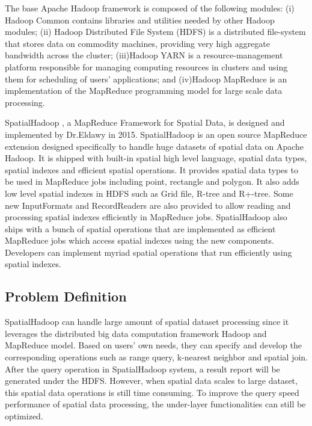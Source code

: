 The base Apache Hadoop framework is composed of the following modules: (i) Hadoop Common contains libraries and utilities needed by other Hadoop modules; (ii) Hadoop Distributed File System (HDFS) is a distributed file-system that stores data on commodity machines, providing very high aggregate bandwidth across the cluster; (iii)Hadoop YARN is a resource-management platform responsible for managing computing resources in clusters and using them for scheduling of users' applications; and (iv)Hadoop MapReduce is an implementation of the MapReduce programming model for large scale data processing.

SpatialHadoop \cite{eldawy2015spatialhadoop}, a MapReduce Framework for Spatial Data, is designed and implemented by Dr.Eldawy in 2015. SpatialHadoop is an open source MapReduce extension designed specifically to handle huge datasets of spatial data on Apache Hadoop. It is shipped with built-in spatial high level language, spatial data types, spatial indexes and efficient spatial operations. It provides spatial data types to be used in MapReduce jobs including point, rectangle and polygon. It also adds low level spatial indexes in HDFS such as Grid file, R-tree and R+-tree. Some new InputFormats and RecordReaders are also provided to allow reading and processing spatial indexes efficiently in MapReduce jobs. SpatialHadoop also ships with a bunch of spatial operations that are implemented as efficient MapReduce jobs which access spatial indexes using the new components. Developers can implement myriad spatial operations that run efficiently using spatial indexes.


\subsection{Problem Definition}

SpatialHadoop can handle large amount of spatial dataset processing since it leverages the distributed big data computation framework Hadoop and MapReduce \cite{dean2008mapreduce} model. Based on users' own needs, they can specify and develop the corresponding operations such as range query, k-nearest neighbor and spatial join. After the query operation in SpatialHadoop system, a result report will be generated under the HDFS. However, when spatial data scales to large dataset, this spatial data operations is still time consuming. To improve the query speed performance of spatial data processing, the under-layer functionalities can still be optimized. 


